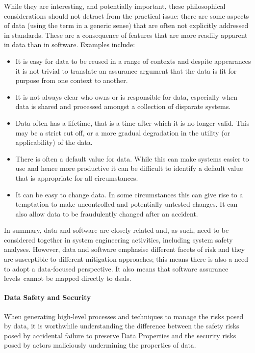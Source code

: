 While they are interesting, and potentially important, these philosophical considerations should not detract from the practical issue: there are some aspects of data (using the term in a generic sense) that are often not explicitly addressed in standards. These are a consequence of features that are more readily apparent in data than in software. Examples include:
\begin{itemize}
  \item It is easy for data to be reused in a range of contexts and despite appearances it is not trivial to translate an assurance argument that the data is fit for purpose from one context to another.
  \item It is not always clear who owns or is responsible for data, especially when data is shared and processed amongst a collection of disparate systems.
	\item Data often has a \gls{lifetime}, that is a time after which it is no longer valid. This may be a strict cut off, or a more gradual degradation in the utility (or applicability) of the data.
  \item There is often a default value for data. While this can make systems easier to use and hence more productive it can be difficult to identify a default value that is appropriate for all circumstances.
  \item It can be easy to change data. In some circumstances this can give rise to a temptation to make uncontrolled and potentially untested changes. It can also allow data to be fraudulently changed after an accident.
\end{itemize}
In summary, data and software are closely related and, as such, need to be considered together in system engineering activities, including system safety analyses. However, data and software emphasise different facets of risk and they are susceptible to different mitigation approaches; this means there is also a need to adopt a data-focused perspective. It also means that \cbstart{}\glspl{software assurance level}\cbend\ cannot be mapped directly to \glspl{dsal}.

\paragraph{Data Safety and Security}
When generating high-level processes and techniques to manage the risks posed by data, it is worthwhile understanding the difference between the safety risks posed by accidental failure to preserve Data Properties and the security risks posed by actors maliciously undermining the properties of data.

